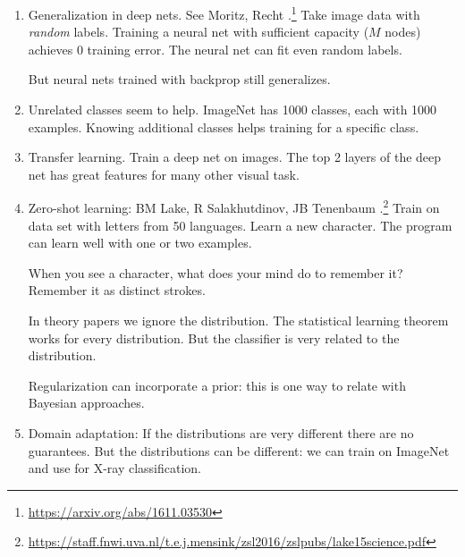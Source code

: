 \begin{enumerate}
\item
Generalization in deep nets. See Moritz, Recht \cite{zhang2016understanding}.\footnote{\url{https://arxiv.org/abs/1611.03530}} Take image data with \emph{random} labels. Training a neural net with sufficient capacity ($M$ nodes) achieves 0 training error. The neural net can fit even random labels.

But neural nets trained with backprop still generalizes.

%
\item
Unrelated classes seem to help. ImageNet has 1000 classes, each with 1000 examples. %
Knowing additional classes helps training for a specific class.
\item
Transfer learning. Train a deep net on images. The top 2 layers of the deep net has great features for many other visual task.
\item
Zero-shot learning: BM Lake, R Salakhutdinov, JB Tenenbaum \cite{lake2015human}.\footnote{\url{https://staff.fnwi.uva.nl/t.e.j.mensink/zsl2016/zslpubs/lake15science.pdf}}
Train on data set with letters from 50 languages. Learn a new character. The program can learn well with one or two examples.

When you see a character, what does your mind do to remember it? Remember it as distinct strokes.  

In theory papers we ignore the distribution. The statistical learning theorem works for every distribution.
But the classifier is very related to the distribution.

Regularization can incorporate a prior: this is one way to relate with Bayesian approaches.
\item
Domain adaptation: If the distributions are very different there are no guarantees. But the distributions can be different: we can train on ImageNet and use for X-ray classification.


\end{enumerate}
